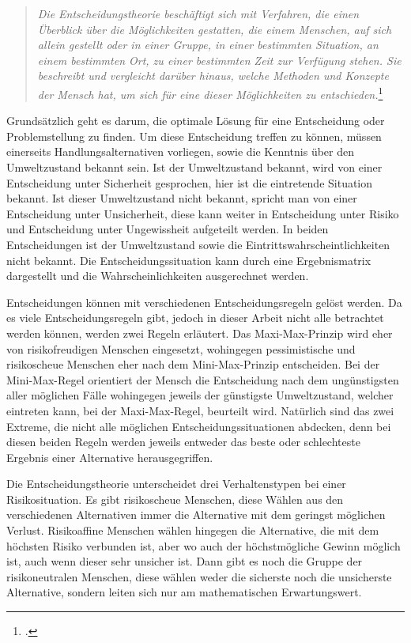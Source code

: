 \begin{quote}
	\textit{\glqq Die Entscheidungstheorie beschäftigt sich mit Verfahren, die einen Überblick über die Möglichkeiten gestatten, die einem Menschen, auf sich allein gestellt oder in einer Gruppe, in einer bestimmten Situation, an einem bestimmten Ort, zu einer bestimmten Zeit zur Verfügung stehen. Sie beschreibt und vergleicht darüber hinaus, welche Methoden und Konzepte der Mensch hat, um sich für eine dieser Möglichkeiten zu entschieden.\grqq}\footcite[S. 1]{wessler}
\end{quote}

Grundsätzlich geht es darum, die optimale Lösung für eine Entscheidung oder Problemstellung zu finden. Um diese Entscheidung treffen zu können, müssen einerseits Handlungsalternativen vorliegen, sowie die Kenntnis über den Umweltzustand bekannt sein. Ist der Umweltzustand bekannt, wird von einer Entscheidung unter Sicherheit gesprochen, hier ist die eintretende Situation bekannt. Ist dieser Umweltzustand nicht bekannt, spricht man von einer Entscheidung unter Unsicherheit, diese kann weiter in Entscheidung unter Risiko und Entscheidung unter Ungewissheit aufgeteilt werden. In beiden Entscheidungen ist der Umweltzustand sowie die Eintrittswahrscheintlichkeiten nicht bekannt. Die Entscheidungssituation kann durch eine Ergebnismatrix dargestellt und die Wahrscheinlichkeiten ausgerechnet werden.

Entscheidungen können mit verschiedenen Entscheidungsregeln gelöst werden. Da es viele Entscheidungsregeln gibt, jedoch in dieser Arbeit nicht alle betrachtet werden können, werden zwei Regeln erläutert. Das Maxi-Max-Prinzip wird eher von risikofreudigen Menschen eingesetzt, wohingegen pessimistische und risikoscheue Menschen eher nach dem Mini-Max-Prinzip entscheiden. Bei der Mini-Max-Regel orientiert der Mensch die Entscheidung nach dem ungünstigsten aller möglichen Fälle wohingegen jeweils der günstigste Umweltzustand, welcher eintreten kann, bei der Maxi-Max-Regel, beurteilt wird.
Natürlich sind das zwei Extreme, die nicht alle möglichen Entscheidungssituationen abdecken, denn bei diesen beiden Regeln werden jeweils entweder das beste oder schlechteste Ergebnis einer Alternative herausgegriffen.

Die Entscheidungstheorie unterscheidet drei Verhaltenstypen bei einer Risikosituation. Es gibt risikoscheue Menschen, diese Wählen aus den verschiedenen Alternativen immer die Alternative mit dem geringst möglichen  Verlust. Risikoaffine Menschen wählen hingegen die Alternative, die mit dem höchsten Risiko verbunden ist, aber wo auch der höchstmögliche Gewinn möglich ist, auch wenn dieser sehr unsicher ist. Dann gibt es noch die Gruppe der risikoneutralen Menschen, diese wählen weder die sicherste noch die unsicherste Alternative, sondern leiten sich nur am mathematischen Erwartungswert.

